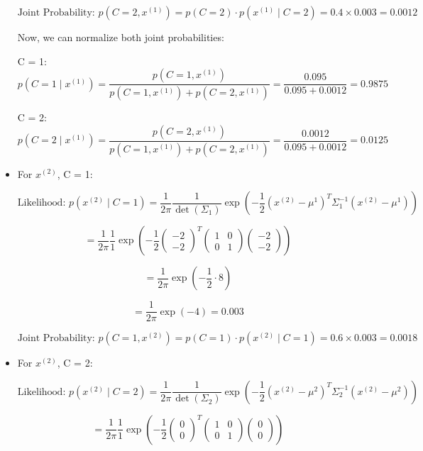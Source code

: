\documentclass{article}
\begin{document}
\begin{itemize}
\[
\text{Joint Probability: } p(C = 2, x^{(1)}) = p(C = 2) \cdot p(x^{(1)} \mid C = 2) = 0.4 \times 0.003 = 0.0012
\]

Now, we can normalize both joint probabilities:

C = 1:
\[
p(C = 1 \mid x^{(1)}) = \frac{p(C = 1, x^{(1)})}{p(C = 1, x^{(1)}) + p(C = 2, x^{(1)})} = \frac{0.095}{0.095 + 0.0012} = 0.9875
\]

C = 2:
\[
p(C = 2 \mid x^{(1)}) = \frac{p(C = 2, x^{(1)})}{p(C = 1, x^{(1)}) + p(C = 2, x^{(1)})} = \frac{0.0012}{0.095 + 0.0012} = 0.0125
\]

 \item[\textbullet] For \( x^{(2)} \), C = 1: 

\[
\text{Likelihood: } p \left( x^{(2)} \mid C = 1 \right) = \frac{1}{2\pi} \frac{1}{\det(\Sigma_1)} \exp \left( -\frac{1}{2} \left( x^{(2)} - \mu^1 \right)^T \Sigma_1^{-1} \left( x^{(2)} - \mu^1 \right) \right)
\]

\[
= \frac{1}{2\pi} \frac{1}{1} \exp \left( -\frac{1}{2} \begin{pmatrix} -2 \\ -2 \end{pmatrix}^T \begin{pmatrix} 1 & 0 \\ 0 & 1 \end{pmatrix} \begin{pmatrix} -2 \\ -2 \end{pmatrix} \right)
\]

\[
= \frac{1}{2\pi} \exp \left( -\frac{1}{2} \cdot 8 \right) 
\]

\[
= \frac{1}{2\pi} \exp(-4) = 0.003
\]

\[
\text{Joint Probability: } p(C = 1, x^{(2)}) = p(C = 1) \cdot p(x^{(2)} \mid C = 1) = 0.6 \times 0.003 = 0.0018
\]

\newpage

 \item[\textbullet] For \( x^{(2)} \), C = 2: 

\[
\text{Likelihood: } p \left( x^{(2)} \mid C = 2 \right) = \frac{1}{2\pi} \frac{1}{\det(\Sigma_2)} \exp \left( -\frac{1}{2} \left( x^{(2)} - \mu^2 \right)^T \Sigma_2^{-1} \left( x^{(2)} - \mu^2 \right) \right)
\]

\[
= \frac{1}{2\pi} \frac{1}{1} \exp \left( -\frac{1}{2} \begin{pmatrix} 0 \\ 0 \end{pmatrix}^T \begin{pmatrix} 1 & 0 \\ 0 & 1 \end{pmatrix} \begin{pmatrix} 0 \\ 0 \end{pmatrix} \right)
\]


\end{itemize}
\end{document}
